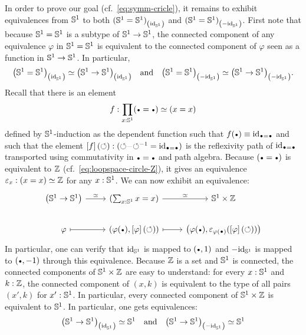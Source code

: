 \documentclass[english,a4]{article}
\renewcommand{\ap}[1]{\left[{#1}\right]}
\begin{document}
In order to prove our goal (cf.~\cref{eq:symm-cricle}), it remains to
exhibit equivalences from ${{\mathbb S^{1}}}$ to both
${({{\mathbb S^{1}}}={{\mathbb S^{1}}})}_{\left(\mathord{\mathrm{id}}_{{\mathbb S^{1}}}\right)}$ and
${({{\mathbb S^{1}}}={{\mathbb S^{1}}})}_{\left(-\mathord{\mathrm{id}}_{{\mathbb S^{1}}}\right)}$. First note that because ${{\mathbb S^{1}}}={{\mathbb S^{1}}}$ is
a subtype of ${{\mathbb S^{1}}}\to{{\mathbb S^{1}}}$, the connected component of any equivalence
$\varphi$ in ${{\mathbb S^{1}}}={{\mathbb S^{1}}}$ is equivalent to the connected component of
$\varphi$ seen as a function in ${{\mathbb S^{1}}} \to {{\mathbb S^{1}}}$. In particular,
\begin{displaymath}
  {\left({{\mathbb S^{1}}}={{\mathbb S^{1}}}\right)}_{\left(\mathord{\mathrm{id}}_{{\mathbb S^{1}}}\right)} \simeq {\left({{\mathbb S^{1}}}\to{{\mathbb S^{1}}}\right)}_{\left(\mathord{\mathrm{id}}_{{\mathbb S^{1}}}\right)}
  \quad\text{and}\quad
  {\left({{\mathbb S^{1}}}={{\mathbb S^{1}}}\right)}_{\left(-\mathord{\mathrm{id}}_{{\mathbb S^{1}}}\right)} \simeq {\left({{\mathbb S^{1}}}\to{{\mathbb S^{1}}}\right)}_{\left(-\mathord{\mathrm{id}}_{{\mathbb S^{1}}}\right)}.
\end{displaymath}
Recall that there is an element
\begin{equation}
  \label{eq:S1-loopspace-Z-at-each-x}%
  f\from \prod_{x:\Sc} (\base=\base) \weq (x=x)
\end{equation}
defined by
${{\mathbb S^{1}}}$-induction as the dependent function such that
$f(\base) \jdeq \id_{\base=\base}$ and such that the element
$\ap f (\Sloop) \from (\Sloop\blank\inv\Sloop = \id_{\base=\base})$ is
the reflexivity path of $\id_{\base=\base}$ transported using
commutativity in $\base=\base$ and path algebra. 
Because $(\base=\base)$ is equivalent
to $\mathbb{Z}$ (cf.~\cref{eq:loopspace-circle-Z}), it gives an equivalence
$\varepsilon_x: (x=x) \simeq \mathbb{Z}$ for any $x:{{\mathbb S^{1}}}$. We can now
exhibit an equivalence:
\begin{displaymath}
  \begin{tikzcd}
    \left(\Sc \to \Sc\right) \rar["\weq"] & (\sum_{x\from\Sc}x=x)
    \rar["\weq"] & \Sc \times \ZZ
    \\
    \varphi \rar[mapsto] & (\varphi(\base),\ap \varphi (\Sloop))
    \rar[mapsto] & \left(%
      \varphi(\base), \varepsilon_{\varphi(\base)}(\ap\varphi(\Sloop))%
    \right)%
\end{tikzcd}
\end{displaymath}
In particular, one can verify that $\mathord{\mathrm{id}}_{{\mathbb S^{1}}}$ is mapped to $(\base,1)$
and $-\mathord{\mathrm{id}}_{{\mathbb S^{1}}}$ is mapped to $(\base,-1)$ through this
equivalence. Because $\mathbb{Z}$ is a set and ${{\mathbb S^{1}}}$ is connected, the
connected components of ${{\mathbb S^{1}}}\times\mathbb{Z}$ are easy to understand: for
every $x:{{\mathbb S^{1}}}$ and $k:\mathbb{Z}$, the connected component of $(x,k)$ is
equivalent to the type of all pairs $(x',k)$ for
$x':{{\mathbb S^{1}}}$. In particular, every connected component of
${{\mathbb S^{1}}}\times\mathbb{Z}$ is equivalent to ${{\mathbb S^{1}}}$. In particular, one gets
equivalences:
\begin{displaymath}
  {\left({{\mathbb S^{1}}}\to {{\mathbb S^{1}}}\right)}_{\left(\mathord{\mathrm{id}}_{{\mathbb S^{1}}}\right)} \simeq {{\mathbb S^{1}}}
  \quad\text{and}\quad
  {\left({{\mathbb S^{1}}}\to {{\mathbb S^{1}}}\right)}_{\left(-\mathord{\mathrm{id}}_{{\mathbb S^{1}}}\right)} \simeq {{\mathbb S^{1}}}
\end{displaymath}
\end{document}
